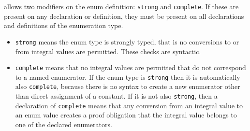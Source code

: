 \NAME{} allows two modifiers on the enum definition: \lstinline|strong| and \lstinline|complete|. If these are present on any declaration or definition, they must be present on all declarations and definitions of the enumeration type.
\begin{itemize}
	\item \lstinline|strong| means the enum type is strongly typed, that is no conversions to or from integral values are permitted. These checks are syntactic.
	\item \lstinline|complete| means that no integral values are permitted that do not correspond to a named enumerator. If the enum type is \lstinline|strong| then it is automatically also \lstinline|complete|, because there is no syntax to create a new enumerator other than direct assignment of a constant. If it is not also \lstinline|strong|, then a declaration of \lstinline|complete| means that any conversion from an integral value to an enum value 
	creates a proof obligation that the integral value belongs to one of the declared enumerators.
\end{itemize}
